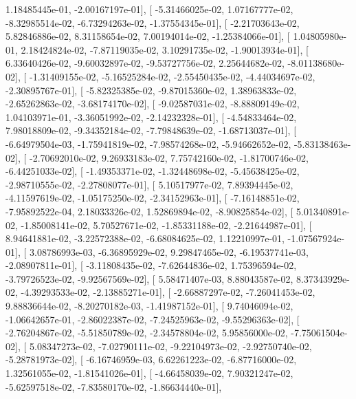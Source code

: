 \documentclass{article}
\begin{document}
          1.18485445e-01,  -2.00167197e-01],
       [ -5.31466025e-02,   1.07167777e-02,  -8.32985514e-02,
         -6.73294263e-02,  -1.37554345e-01],
       [ -2.21703643e-02,   5.82846886e-02,   8.31158654e-02,
          7.00194014e-02,  -1.25384066e-01],
       [  1.04805980e-01,   2.18424824e-02,  -7.87119035e-02,
          3.10291735e-02,  -1.90013934e-01],
       [  6.33640426e-02,  -9.60032897e-02,  -9.53727756e-02,
          2.25644682e-02,  -8.01138680e-02],
       [ -1.31409155e-02,  -5.16525284e-02,  -2.55450435e-02,
         -4.44034697e-02,  -2.30895767e-01],
       [ -5.82325385e-02,  -9.87015360e-02,   1.38963833e-02,
         -2.65262863e-02,  -3.68174170e-02],
       [ -9.02587031e-02,  -8.88809149e-02,   1.04103971e-01,
         -3.36051992e-02,  -2.14232328e-01],
       [ -4.54833464e-02,   7.98018809e-02,  -9.34352184e-02,
         -7.79848639e-02,  -1.68713037e-01],
       [ -6.64979504e-03,  -1.75941819e-02,  -7.98574268e-02,
         -5.94662652e-02,  -5.83138463e-02],
       [ -2.70692010e-02,   9.26933183e-02,   7.75742160e-02,
         -1.81700746e-02,  -6.44251033e-02],
       [ -1.49353371e-02,  -1.32448698e-02,  -5.45638425e-02,
         -2.98710555e-02,  -2.27808077e-01],
       [  5.10517977e-02,   7.89394445e-02,  -4.11597619e-02,
         -1.05175250e-02,  -2.34152963e-01],
       [ -7.16148851e-02,  -7.95892522e-04,   2.18033326e-02,
          1.52869894e-02,  -8.90825854e-02],
       [  5.01340891e-02,  -1.85008141e-02,   5.70527671e-02,
         -1.85331188e-02,  -2.21644987e-01],
       [  8.94641881e-02,  -3.22572388e-02,  -6.68084625e-02,
          1.12210997e-01,  -1.07567924e-01],
       [  3.08786993e-03,  -6.36895929e-02,   9.29847465e-02,
         -6.19537741e-03,  -2.08907811e-01],
       [ -3.11808435e-02,  -7.62644836e-02,   1.75396594e-02,
         -3.79726523e-02,  -9.92567569e-02],
       [  5.58471407e-03,   8.88043587e-02,   8.37343929e-02,
         -4.39293533e-02,  -2.13885271e-01],
       [ -2.66887297e-02,  -7.26041453e-02,   9.88836644e-02,
         -8.20270182e-03,  -1.41987152e-01],
       [  9.74046094e-02,  -1.06642657e-01,  -2.86022387e-02,
         -7.24525963e-02,  -9.55296363e-02],
       [ -2.76204867e-02,  -5.51850789e-02,  -2.34578804e-02,
          5.95856000e-02,  -7.75061504e-02],
       [  5.08347273e-02,  -7.02790111e-02,  -9.22104973e-02,
         -2.92750740e-02,  -5.28781973e-02],
       [ -6.16746959e-03,   6.62261223e-02,  -6.87716000e-02,
          1.32561055e-02,  -1.81541026e-01],
       [ -4.66458039e-02,   7.90321247e-02,  -5.62597518e-02,
         -7.83580170e-02,  -1.86634440e-01],
\end{document}
